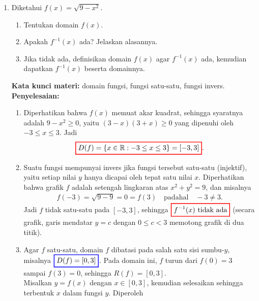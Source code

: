 \documentclass[10pt,openany,a4paper]{article}
\theoremstyle{definition}
\theoremstyle{definition}
\theoremstyle{plain}
\newenvironment{jawab}[2][tes]{%
\par\noindent\textbf{Kata kunci materi:} #1.\\
\textbf{Penyelesaian:} #2%
}{}
\begin{document}
\begin{enumerate}
    \item Diketahui $f(x)=\sqrt{9-x^2}$.
    \begin{enumerate}
        \item Tentukan domain $f(x)$.
        \item Apakah $f^{-1}(x)$ ada? Jelaskan alasannya.
        \item Jika tidak ada, definisikan domain $f(x)$ agar $f^{-1}(x)$ ada, kemudian dapatkan $f^{-1}(x)$ beserta domainnya.
    \end{enumerate}
    \begin{jawab}[domain fungsi, fungsi satu-satu, fungsi invers]{
        \begin{enumerate}
            \item Diperhatikan bahwa $f(x)$ memuat akar kuadrat, sehingga syaratnya adalah $9-x^2\geq 0$, yaitu $(3-x)(3+x)\geq 0$ yang dipenuhi oleh $-3\leq x\leq 3$. Jadi
            \begin{align*}
                \colorlet{oldcolor}{.}
        \color{red}
        \setlength{\fboxrule}{1pt} \boxed{\color{oldcolor}D(f)=\{x\in\mathbb{R} : -3\leq x\leq 3\}=[-3,3]}\color{oldcolor}.
            \end{align*}
            \item Suatu fungsi mempunyai invers jika fungsi tersebut satu-satu (injektif), yaitu setiap nilai $y$ hanya dicapai oleh tepat satu nilai $x$. Diperhatikan bahwa grafik $f$ adalah setengah lingkaran atas $x^2+y^2=9$, dan misalnya
            \begin{align*}
                f(-3)=\sqrt{9-9}=0=f(3) \quad\text{padahal}\quad -3\neq 3.
            \end{align*}
            Jadi $f$ tidak satu-satu pada $[-3,3]$, sehingga $\colorlet{oldcolor}{.}
        \color{red}
        \setlength{\fboxrule}{1pt} \boxed{\color{oldcolor}f^{-1}(x) \text{ tidak ada}}\color{oldcolor}$ (secara grafik, garis mendatar $y=c$ dengan $0\leq c<3$ memotong grafik di dua titik).
            \item Agar $f$ satu-satu, domain $f$ dibatasi pada salah satu sisi sumbu-$y$, misalnya $\colorlet{oldcolor}{.}
        \color{blue}
        \setlength{\fboxrule}{1pt} \boxed{\color{oldcolor}D(f)=[0,3]}\color{oldcolor}$. Pada domain ini, $f$ turun dari $f(0)=3$ sampai $f(3)=0$, sehingga $R(f)=[0,3]$.\\
            Misalkan $y=f(x)$ dengan $x\in[0,3]$, kemudian selesaikan sehingga terbentuk $x$ dalam fungsi $y$. Diperoleh
            \begin{align*}

\end{align*}
\end{enumerate}}
\end{jawab}
\end{enumerate}
\end{document}

